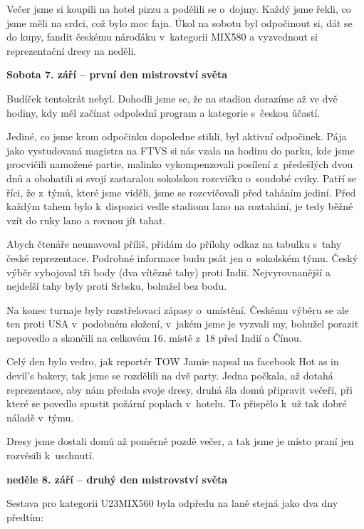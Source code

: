 \documentclass[11pt]{article}
\begin{document}
Večer jsme si koupili na hotel pizzu a podělili se o~dojmy. Každý jsme řekli, co jsme měli na srdci, což bylo moc fajn. Úkol na sobotu byl odpočinout si, dát se do kupy, fandit českému nároďáku v~kategorii MIX580 a vyzvednout si reprezentační dresy na neděli.


\vspace*{12pt}
\noindent\textbf{Sobota 7. září – první den mistrovství světa}
\vspace*{6pt}

\noindent
Budíček tentokrát nebyl. Dohodli jsme se, že na stadion dorazíme až ve dvě hodiny, kdy měl začínat odpolední program a kategorie s~českou účastí.

Jediné, co jsme krom odpočinku dopoledne stihli, byl aktivní odpočinek. Pája jako vystudovaná magistra na FTVS si nás vzala na hodinu do parku, kde jsme procvičili namožené partie, malinko vykompenzovali posílení z~předešlých dvou dnů a obohatili si svojí zastaralou sokolskou rozcvičku o~soudobé cviky.
Patří se říci, že z~týmů, které jsme viděli, jsme se rozcvičovali před taháním jediní. Před každým tahem bylo k~dispozici vedle stadionu lano na roztahání, je tedy běžné vzít do ruky lano a rovnou jít tahat.

Abych čtenáře neunavoval příliš, přidám do přílohy odkaz na tabulku s~tahy české reprezentace. Podrobné informace budu psát jen o~sokolském týmu. Český výběr vybojoval tři body (dva vítězné tahy) proti Indii. Nejvyrovnanější a nejdelší tahy byly proti Srbsku, bohužel bez bodu.

Na konec turnaje byly rozstřelovací zápasy o~umístění. Českému výběru se ale ten proti USA v~podobném složení, v~jakém jsme je vyzvali my, bohužel porazit nepovedlo a skončili na celkovém 16. místě z~18 před Indií a Čínou.

Celý den bylo vedro, jak reportér TOW Jamie napsal na facebook \luv{}Hot as in devil's bakery\ruv{}, tak jsme se rozdělili na dvě party. Jedna počkala, až dotahá reprezentace, aby nám předala svoje dresy, druhá šla domů připravit večeři, při které se povedlo spustit požární poplach v~hotelu. To přispělo k~už tak dobré náladě v~týmu.

Dresy jsme dostali domů až poměrně pozdě večer, a tak jsme je místo praní jen rozvěsili k~uschnutí.


\vspace*{12pt}
\noindent\textbf{neděle 8. září – druhý den mistrovství světa}
\vspace*{6pt}

\noindent
Sestava pro kategorii U23MIX560 byla odpředu na laně stejná jako dva dny předtím:
\end{document}
